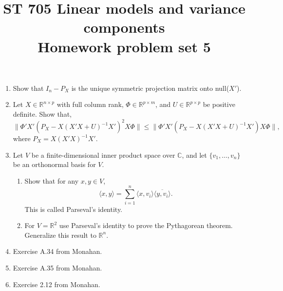 \documentclass[11pt]{article}
\title{ST 705 Linear models and variance components \\ 
        Homework problem set 5}
\begin{document}
\maketitle

\begin{enumerate}

\item Show that $I_{n} - P_{X}$ is the unique symmetric projection matrix onto null($X'$).

\item Let $X \in \mathbb{R}^{n\times p}$ with full column rank, $\Phi \in \mathbb{R}^{p\times m}$, and $U \in \mathbb{R}^{p\times p}$ be positive definite.  Show that,
\[
\|\Phi' X'(P_{X} - X(X'X + U)^{-1}X')^{2}X\Phi\| \le \|\Phi' X'(P_{X} - X(X'X + U)^{-1}X')X\Phi\|,
\]
where $P_{X} = X(X'X)^{-1}X'$.


\item Let $V$ be a finite-dimensional inner product space over $\mathbb{C}$, and let $\{v_{1},\dots,v_{n}\}$ be an orthonormal basis for $V$.  
\begin{enumerate}
\item Show that for any $x,y \in V$,
\[
\langle x,y\rangle = \sum_{i=1}^{n}\langle x,v_{i} \rangle\overline{\langle y,v_{i} \rangle}.
\]
This is called Parseval's identity.
\item For $V = \mathbb{R}^{2}$ use Parseval's identity to prove the Pythagorean theorem.  Generalize this result to $\mathbb{R}^{n}$.
\end{enumerate}


\item Exercise A.34 from Monahan.

\item Exercise A.35 from Monahan.

\item Exercise 2.12 from Monahan.


\end{enumerate}
\end{document}
